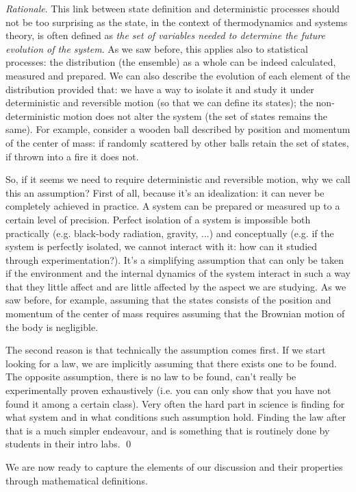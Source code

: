 \documentclass[aps,pra,10pt,twocolumn,floatfix,nofootinbib]{revtex4-1}
\theoremstyle{definition}
\newenvironment{rationale}{\emph{Rationale}.}{\qed}
\begin{document}
\begin{rationale}
This link between state definition and deterministic processes should not be too surprising as the state, in the context of thermodynamics and systems theory, is often defined as \emph{the set of variables needed to determine the future evolution of the system}. As we saw before, this applies also to statistical processes: the distribution (the ensemble) as a whole can be indeed calculated, measured and prepared. We can also describe the evolution of each element of the distribution provided that: we have a way to isolate it and study it under deterministic and reversible motion (so that we can define its states); the non-deterministic motion does not alter the system (the set of states remains the same). For example, consider a wooden ball described by position and momentum of the center of mass: if randomly scattered by other balls retain the set of states, if thrown into a fire it does not.

So, if it seems we need to require deterministic and reversible motion, why we call this an assumption? First of all, because it's an idealization: it can never be completely achieved in practice. A system can be prepared or measured up to a certain level of precision. Perfect isolation of a system is impossible both practically (e.g. black-body radiation, gravity, ...) and conceptually (e.g. if the system is perfectly isolated, we cannot interact with it: how can it studied through experimentation?). It's a simplifying assumption that can only be taken if the environment and the internal dynamics of the system interact in such a way that they little affect and are little affected by the aspect we are studying. As we saw before, for example, assuming that the states consists of the position and momentum of the center of mass requires assuming that the Brownian motion of the body is negligible.

The second reason is that technically the assumption comes first. If we start looking for a law, we are implicitly assuming that there exists one to be found. The opposite assumption, there is no law to be found, can't really be experimentally proven exhaustively (i.e. you can only show that you have not found it among a certain class). Very often the hard part in science is finding for what system and in what conditions such assumption hold. Finding the law after that is a much simpler endeavour, and is something that is routinely done by students in their intro labs.
\end{rationale}

We are now ready to capture the elements of our discussion and their properties through mathematical definitions.
\end{document}
